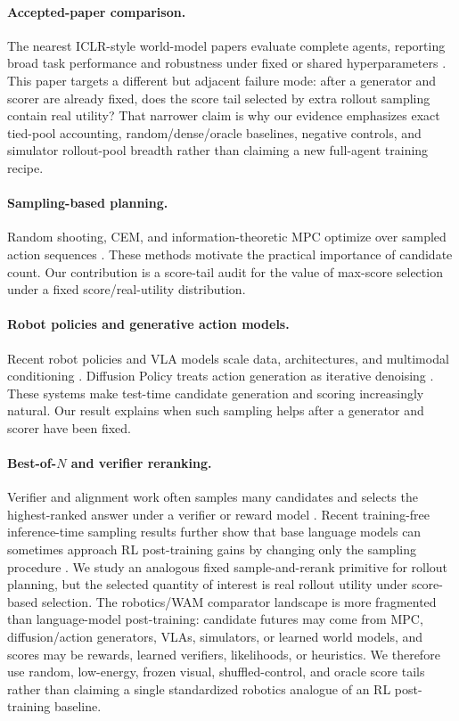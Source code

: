 \documentclass{article}
\begin{document}
\paragraph{Accepted-paper comparison.}
The nearest ICLR-style world-model papers evaluate complete agents, reporting broad task performance and robustness under fixed or shared hyperparameters \citep{hafner2023dreamerv3,hansen2024tdmpc2}. This paper targets a different but adjacent failure mode: after a generator and scorer are already fixed, does the score tail selected by extra rollout sampling contain real utility? That narrower claim is why our evidence emphasizes exact tied-pool accounting, random/dense/oracle baselines, negative controls, and simulator rollout-pool breadth rather than claiming a new full-agent training recipe.

\paragraph{Sampling-based planning.}
Random shooting, CEM, and information-theoretic MPC optimize over sampled action sequences \citep{rubinstein1999cem,williams2017itmmpc}. These methods motivate the practical importance of candidate count. Our contribution is a score-tail audit for the value of max-score selection under a fixed score/real-utility distribution.

\paragraph{Robot policies and generative action models.}
Recent robot policies and VLA models scale data, architectures, and multimodal conditioning \citep{brohan2022rt1,brohan2023rt2,octo2024}. Diffusion Policy treats action generation as iterative denoising \citep{chi2023diffusionpolicy}. These systems make test-time candidate generation and scoring increasingly natural. Our result explains when such sampling helps after a generator and scorer have been fixed.

\paragraph{Best-of-$N$ and verifier reranking.}
Verifier and alignment work often samples many candidates and selects the highest-ranked answer under a verifier or reward model \citep{cobbe2021verifiers,beirami2024bestofn}. Recent training-free inference-time sampling results further show that base language models can sometimes approach RL post-training gains by changing only the sampling procedure \citep{karan2026reasoning}. We study an analogous fixed sample-and-rerank primitive for rollout planning, but the selected quantity of interest is real rollout utility under score-based selection. The robotics/WAM comparator landscape is more fragmented than language-model post-training: candidate futures may come from MPC, diffusion/action generators, VLAs, simulators, or learned world models, and scores may be rewards, learned verifiers, likelihoods, or heuristics. We therefore use random, low-energy, frozen visual, shuffled-control, and oracle score tails rather than claiming a single standardized robotics analogue of an RL post-training baseline.
\end{document}
